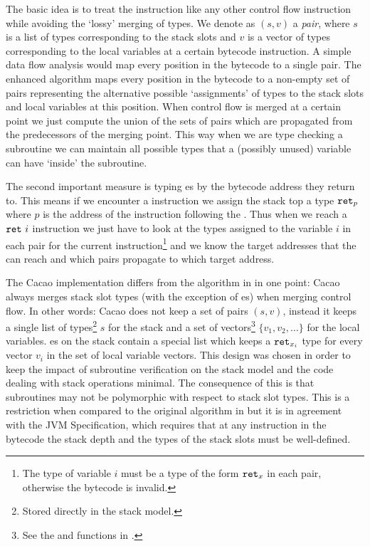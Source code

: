 The basic idea is to treat the  instruction like any other
control flow instruction while avoiding the `lossy' merging of types.
We denote as $(s,v)$ a \emph{pair}, where $s$ is a list of types
corresponding to the stack slots and $v$ is a vector of types
corresponding to the local variables at a certain bytecode
instruction. A simple data flow analysis would map every position in
the bytecode to a single pair. The enhanced algorithm maps every
position in the bytecode to a non-empty set of pairs representing the
alternative possible `assignments' of types to the stack slots and
local variables at this position. When control flow is merged at a
certain point we just compute the union of the sets of pairs which
are propagated from the predecessors of the merging point. This way
when we are type checking a subroutine we can maintain all possible
types that a (possibly unused) variable can have `inside' the
subroutine.

The second important measure is typing es by the
bytecode address they return to. This means if we encounter a
 instruction we assign the stack top a type $\texttt{ret}_p$
where $p$ is the address of the instruction following the .
Thus when we reach a $\texttt{ret}\ i$ instruction we just have to look
at the types assigned to the variable $i$ in each pair for the current
instruction\footnote{The type of variable $i$ must be a type of the
form $\texttt{ret}_x$ in each pair, otherwise the bytecode is invalid.} 
and we know the target addresses that the  can reach and
which pairs propagate to which target address.

The Cacao implementation differs from the algorithm in \cite{Coglio02}
in one point: Cacao always merges stack slot types (with the exception
of es) when merging control flow. In other words:
Cacao does not keep a set of pairs $(s,v)$, instead it keeps a single
list of types\footnote{Stored directly in the stack model.} $s$ for the
stack and a set of vectors\footnote{See the
 and  functions in
.} $\{v_1, v_2, \dots\}$ for the local variables.
es on the stack contain a special list which keeps a
$\texttt{ret}_{x_i}$ type for every vector $v_i$ in the set of local
variable vectors. This design was chosen in order to keep the impact
of subroutine verification on the stack model and the code dealing
with stack operations minimal. The consequence of this is that
subroutines may not be polymorphic with respect to stack slot
types. This is a restriction when compared to the original algorithm
in \cite{Coglio02} but it is in agreement with the JVM Specification,
which requires that at any instruction in the bytecode the stack depth
and the types of the stack slots must be well-defined.
